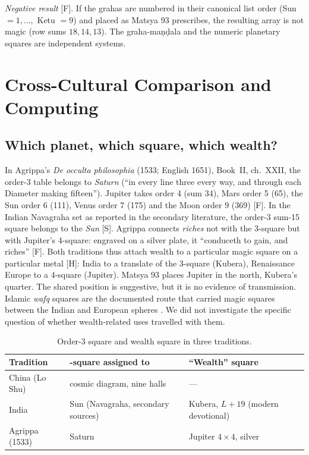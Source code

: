 \documentclass[journal]{IEEEtran}
\theoremstyle{definition}
\newcommand{\Fact}{\textsf{[F]}}
\newcommand{\Schol}{\textsf{[S]}}
\newcommand{\Hyp}{\textsf{[H]}}
\begin{document}
\emph{Negative result} \Fact. If the grahas are numbered in their canonical list order (Sun $=1,\dots,$ Ketu $=9$) and placed as Matsya 93 prescribes, the resulting array is not magic (row sums $18,14,13$). The graha-maṇḍala and the numeric planetary squares are independent systems.

\section{Cross-Cultural Comparison and Computing}
\label{sec:cross}
\subsection{Which planet, which square, which wealth?}
In Agrippa's \emph{De occulta philosophia} (1533; English 1651), Book~II, ch.~XXII, the order-3 table belongs to \emph{Saturn} (``in every line three every way, and through each Diameter making fifteen''). Jupiter takes order 4 (sum 34), Mars order 5 (65), the Sun order 6 (111), Venus order 7 (175) and the Moon order 9 (369) \cite{agrippa1651} \Fact. In the Indian Navagraha set as reported in the secondary literature, the order-3 sum-15 square belongs to the \emph{Sun} \cite{datta1992} \Schol. Agrippa connects \emph{riches} not with the 3-square but with Jupiter's 4-square: engraved on a silver plate, it ``conduceth to gain, and riches'' \cite{agrippa1651} \Fact. Both traditions thus attach wealth to a particular magic square on a particular metal \Hyp: India to a translate of the 3-square (Kubera), Renaissance Europe to a 4-square (Jupiter). Matsya 93 places Jupiter in the north, Kubera's quarter. The shared position is suggestive, but it is no evidence of transmission. Islamic \emph{wafq} squares are the documented route that carried magic squares between the Indian and European spheres \cite{cammann1969a,cammann1969b}. We did not investigate the specific question of whether wealth-related uses travelled with them.

\begin{table}[t]
\caption{Order-3 square and wealth square in three traditions.}
\label{tab:cross}
\centering\small
\setlength{\tabcolsep}{3pt}
\begin{tabular}{@{}>{\raggedright\arraybackslash}p{}>{\raggedright\arraybackslash}p{}>{\raggedright\arraybackslash}p{}@{}}
\toprule
Tradition & 3-square assigned to & ``Wealth'' square\\
\midrule
China (Lo Shu) & cosmic diagram, nine halls \cite{cammann1961} & ---\\
India & Sun (Navagraha, secondary sources) & Kubera, $L+19$ (modern devotional)\\
Agrippa (1533) & Saturn \cite{agrippa1651} & Jupiter $4\times4$, silver \cite{agrippa1651}\\
\bottomrule
\end{tabular}
\end{table}
\end{document}
